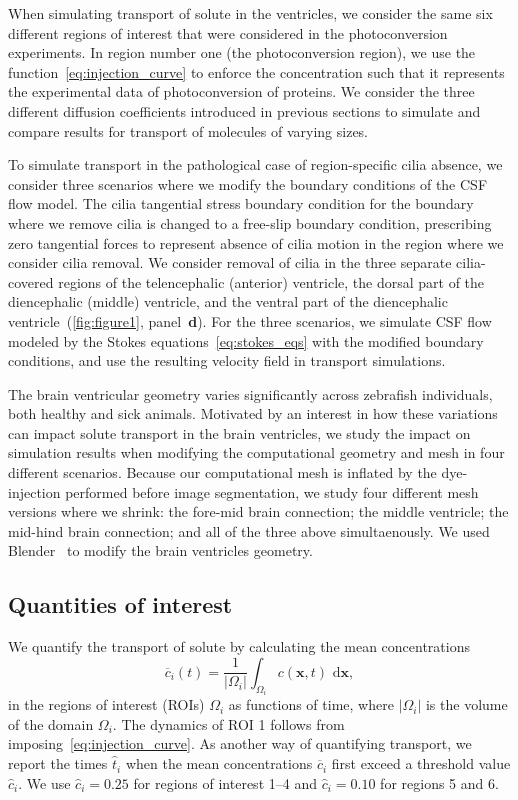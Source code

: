 \documentclass[fleqn]{wlscirep}
\newcommand{\dx}{\, \mathrm d\bm{x}}
\newcommand{\xx}{\bm{x}}
\begin{document}
When simulating transport of solute in the ventricles, we consider the same six different regions of interest that were considered in the photoconversion experiments. In region number one (the photoconversion region), we use the function~\eqref{eq:injection_curve} to enforce the concentration such that it represents the experimental data of photoconversion of proteins. We consider the three different diffusion coefficients introduced in previous sections to simulate and compare results for transport of molecules of varying sizes.

To simulate transport in the pathological case of region-specific cilia absence, we consider three scenarios where we modify the boundary conditions of the CSF flow model. The cilia tangential stress boundary condition for the boundary where we remove cilia is changed to a free-slip boundary condition, prescribing zero tangential forces to represent absence of cilia motion in the region where we consider cilia removal. We consider removal of cilia in the three separate cilia-covered regions of the telencephalic (anterior) ventricle, the dorsal part of the diencephalic (middle) ventricle, and the ventral part of the diencephalic ventricle~(\cref{fig:figure1}, panel~\textbf{d}). For the three scenarios, we simulate CSF flow modeled by the Stokes equations~\eqref{eq:stokes_eqs} with the modified boundary conditions, and use the resulting velocity field in transport simulations.

The brain ventricular geometry varies significantly across zebrafish individuals, both healthy and sick animals. Motivated by an interest in how these variations can impact solute transport in the brain ventricles, we study the impact on simulation results when modifying the computational geometry and mesh in four different scenarios. Because our computational mesh is inflated by the dye-injection performed before image segmentation, we study four different mesh versions where we shrink: the fore-mid brain connection; the middle ventricle; the mid-hind brain connection; and all of the three above simultaenously. We used Blender~\cite{Community2018BlenderPackage} to modify the brain ventricles geometry.

\subsection*{Quantities of interest}
We quantify the transport of solute by calculating the mean concentrations
\begin{equation}
    \overline{c}_i(t) = \frac{1}{|\Omega_i|}\int_{\Omega_i} c(\xx, t)\,\dx,
    \label{eq:c_mean_i}
\end{equation}
in the regions of interest (ROIs) $\Omega_i$ as functions of time, where $|\Omega_i|$ is the volume of the domain $\Omega_i$. The dynamics of ROI 1 follows from imposing~\cref{eq:injection_curve}. As another way of quantifying transport, we report the times $\hat{t}_i$ when the mean concentrations $\overline{c}_i$ first exceed a threshold value $\hat{c}_i$. We use $\hat{c}_i=0.25$ for regions of interest 1--4 and $\hat{c}_i=0.10$ for regions 5 and 6.
\end{document}
